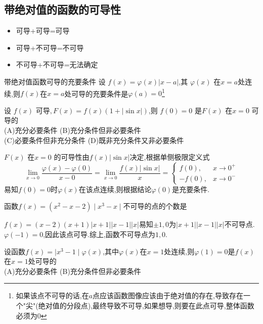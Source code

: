 \documentclass[8pt a4paper, oneside, UTF8]{ctexbook}  %
\begin{document}
\begin{sloppypar}
    \subsection{带绝对值的函数的可导性}
    \begin{itemize}
        \item 可导+可导=可导
        \item 可导+不可导=不可导
        \item 不可导+不可导=无法确定
    \end{itemize}
    \begin{conclusion}{带绝对值函数可导的充要条件}{}
        设 $f(x)=\varphi(x)\left|x-a\right|$,其 $\varphi(x)$ 在$x=a$处连续,则$f\left(x\right)$在$x=a$处可导的充要条件是$\varphi\left(a\right)=0$\footnote{如果该点不可导的话,在$a$点应该函数图像应该由于绝对值的存在,导致存在一个"尖"(绝对值的分段点),最终导致不可导,如果想导,则要在此点可导,整体函数必须为0}
    \end{conclusion}
    \begin{problem}
    设 $f(x)$ 可导$,F(x)=f(x)(1+|\sin x|)$,则 $f(0)=0$ 是$F(x)$ 在$x=0$ 可导的\\
    (A)充分必要条件 \quad (B)充分条件但非必要条件\\
    (C)必要条件但非充分条件 \quad (D)既非充分条件又非必要条件
    \end{problem}
    \begin{solution}
        $F(x)$ 在$x=0$ 的可导性由$f(x)|\sin x|$决定,根据单侧极限定义式
        $$\lim\limits_{x\to0}\frac{\varphi(x)-\varphi(0)}{x-0}=\lim\limits_{x\to0}\frac{f(x)\left|\sin x\right|}{x}=\begin{cases}f(0) ,&x\to0^+\\[2ex]-f(0) ,&x\to0^-\end{cases}$$
        易知$f(0)=0$时$\varphi(x)$在该点连续,则根据结论$\varphi(0)$是充要条件.
    \end{solution}
    \begin{problem}
    函数$f(x)=(x^2-x-2)\mid x^3-x\mid$不可导的点的个数是
    \end{problem}
    \begin{solution}
        $f(x)=(x-2)(x+1)|x+1||x-1||x|$易知$\pm 1,0$为$|x+1||x-1||x|$不可导点.$\varphi(-1) = 0$,因此该点可导.综上,函数不可导点为$1,0$.
    \end{solution}
    \begin{problem}
    设函数$f(x)=\mid x^3-1\mid\varphi(x)$,其中$\varphi(x)$在$x=1$处连续,则$\varphi(1)=0$是$f(x)$在$x=1$处可导的 \\
    (A)充分必要条件 \quad (B)充分条件但非必要条件\\

\end{problem}
\end{sloppypar}
\end{document}
